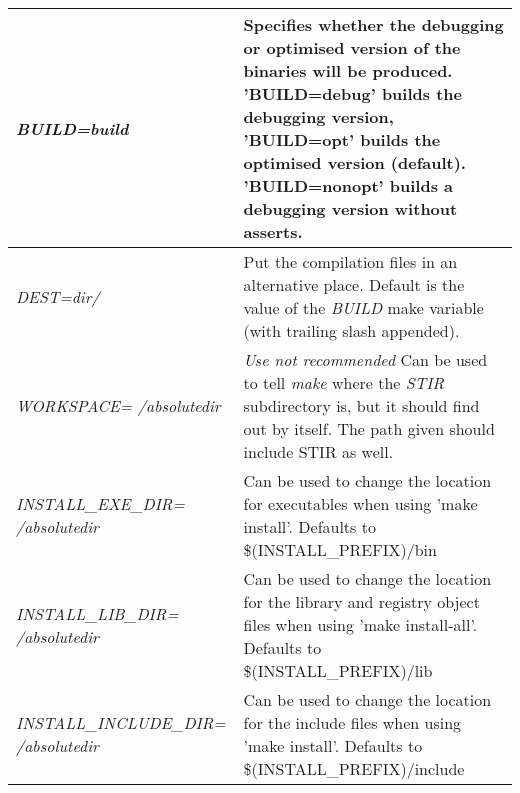 \documentclass{article}
\begin{document}
\newlength{\MakeTableFirstCol}
\newlength{\MakeTableSecondCol}
\setlength{\MakeTableFirstCol}{2.5in}
\setlength{\MakeTableSecondCol}{\textwidth}
\addtolength{\MakeTableSecondCol}{-\MakeTableFirstCol}
\begin{longtable}{|p{\MakeTableFirstCol}|p{\MakeTableSecondCol}|}
\hline

{\raggedright
\textit{BUILD=build}} & 

{\raggedright
Specifies whether the debugging or optimised version of the 
binaries will be produced. 'BUILD=debug' builds the debugging 
version, 'BUILD=opt' builds the optimised version (default).
'BUILD=nonopt' builds a debugging version without asserts.} \\
\hline

{\raggedright
\textit{DEST=dir/}} & 

{\raggedright
Put the compilation files in an alternative place. Default is the value
of the \textit{BUILD} make variable (with trailing slash appended).} \\
\hline

{\raggedright
\textit{WORKSPACE= \linebreak
/absolutedir}} & 

{\raggedright
\textit{Use not recommended} \linebreak
Can be used to tell \textit{make} where the \textit{STIR} subdirectory is, 
but it should find out by itself. The path given should include 
STIR as well.} \\
\hline

{\raggedright
\textit{INSTALL\_EXE\_DIR= \linebreak
/absolutedir}} & 

{\raggedright
Can be used to change the location for executables when using 
'make install'. Defaults to \$(INSTALL\_PREFIX)/bin} \\
\hline

{\raggedright
\textit{INSTALL\_LIB\_DIR= \linebreak
/absolutedir}} & 

{\raggedright
Can be used to change the location for the library and registry 
object files when using 'make install-all'. Defaults to \$(INSTALL\_PREFIX)/lib} \\
\hline

{\raggedright
\textit{INSTALL\_INCLUDE\_DIR= \linebreak
/absolutedir}} & 

{\raggedright
Can be used to change the location for the include files when 
using 'make install'. Defaults to \$(INSTALL\_PREFIX)/include} \\
\hline


\end{longtable}
\end{document}
